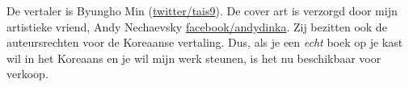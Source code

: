 \iffalse
\begin{figure}[H]
\centering
\texttt{[image: acorn\_cover.jpg]}
\end{figure}
\fi

De vertaler is Byungho Min (\href{https://twitter.com/tais9}{twitter/tais9}).
De cover art is verzorgd door mijn artistieke vriend, Andy Nechaevsky
\href{https://www.facebook.com/andydinka}{facebook/andydinka}.
Zij bezitten ook de auteursrechten voor de Koreaanse vertaling.
Dus, als je een \emph{echt} boek op je kast wil in het Koreaans en je
wil mijn werk steunen, is het nu beschikbaar voor verkoop.


